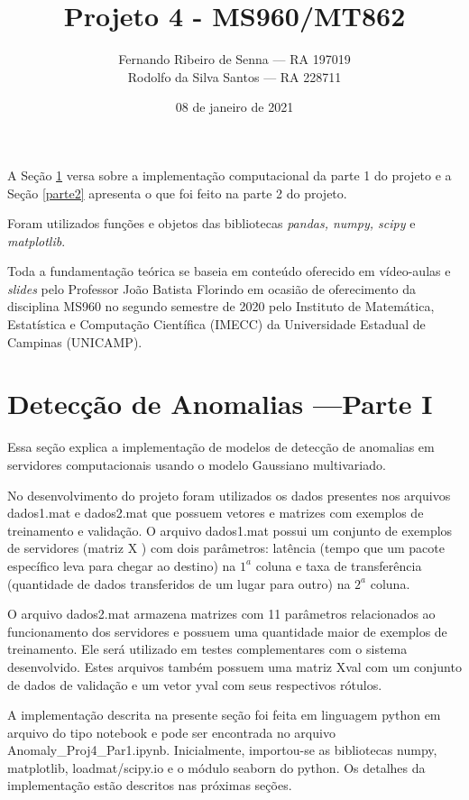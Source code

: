 \documentclass[12pt]{article}
\title{Projeto 4 - MS960/MT862}
\author{Fernando Ribeiro de Senna --- RA 197019\\
Rodolfo da Silva Santos --- RA 228711}
\date{08 de janeiro de 2021}
\begin{document}
\maketitle

A Seção \ref{parte1} versa sobre a implementação computacional da parte 1 do projeto e a Seção \ref{parte2} apresenta o que foi feito na parte 2 do projeto.

Foram utilizados funções e objetos das bibliotecas \textit{pandas, numpy, scipy} e \textit{matplotlib}. 

Toda a fundamentação teórica se baseia em conteúdo oferecido em vídeo-aulas e \textit{slides} pelo Professor João Batista Florindo em ocasião de oferecimento da disciplina MS960 no segundo semestre de 2020 pelo Instituto de Matemática, Estatística e Computação Científica (IMECC) da Universidade Estadual de Campinas (UNICAMP).




\section{Detecção de Anomalias ---Parte I} \label{parte1}

Essa seção explica a implementação de modelos de detecção de anomalias em servidores computacionais usando o modelo Gaussiano multivariado.

No desenvolvimento do projeto foram utilizados os dados presentes nos arquivos dados1.mat e dados2.mat que possuem vetores e matrizes com exemplos de treinamento e validação. O arquivo dados1.mat possui um conjunto de exemplos de servidores (matriz X ) com dois parâmetros: latência (tempo que um pacote específico leva para chegar ao destino) na $1^{a}$ coluna e taxa de transferência (quantidade de dados transferidos de um lugar para outro) na $2^{a}$ coluna. 

O arquivo dados2.mat armazena matrizes com 11 parâmetros relacionados ao funcionamento dos servidores e possuem uma quantidade maior de exemplos de treinamento. Ele será utilizado em testes complementares com o sistema desenvolvido. Estes arquivos também possuem uma matriz Xval com um conjunto de dados de validação e um vetor yval com seus respectivos rótulos.

A implementação descrita na presente seção foi feita em linguagem python em arquivo do tipo notebook e pode ser encontrada no arquivo Anomaly\_Proj4\_Par1.ipynb. Inicialmente, importou-se as bibliotecas numpy, matplotlib, loadmat/scipy.io e o módulo seaborn do python. Os detalhes da implementação estão descritos nas próximas seções.
\end{document}
